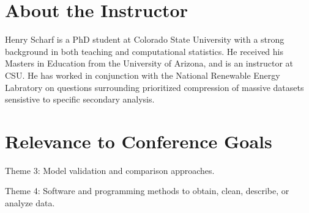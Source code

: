 \documentclass[12pt]{article}
\begin{document}
\section{About the Instructor}

Henry Scharf is a PhD student at Colorado State University with a
strong background in both teaching and computational statistics. He
received his Masters in Education from the University of Arizona, and
is an instructor at CSU. He has worked in conjunction with the 
National Renewable Energy Labratory on questions surrounding
prioritized compression of massive datasets sensistive to specific
secondary analysis.

\section{Relevance to Conference Goals}


Theme 3: Model validation and comparison approaches.

Theme 4: Software and programming methods to obtain, clean, describe,
or analyze data.







\end{document}
